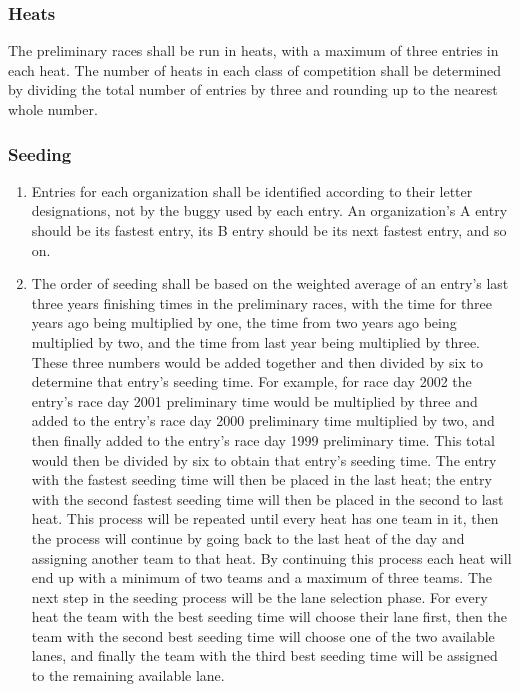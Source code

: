 \subsubsection{Heats}

The preliminary races shall be run in heats, with a maximum of three entries in each heat. The number of heats in each class of competition shall be determined by dividing the total number of entries by three and rounding up to the nearest whole number.

\subsubsection{Seeding}

	\begin{enumerate}
		\item Entries for each organization shall be identified according to their letter designations, not by the buggy used by each entry. An organization's A entry should be its fastest entry, its B entry should be its next fastest entry, and so on.

		\item The order of seeding shall be based on the weighted average of an entry's last three years finishing times in the preliminary races, with the time for three years ago being multiplied by one, the time from two years ago being multiplied by two, and the time from last year being multiplied by three. These three numbers would be added together and then divided by six to determine that entry's seeding time. For example, for race day 2002 the entry's race day 2001 preliminary time would be multiplied by three and added to the entry's race day 2000 preliminary time multiplied by two, and then finally added to the entry's race day 1999 preliminary time. This total would then be divided by six to obtain that entry's seeding time. The entry with the fastest seeding time will then be placed in the last heat; the entry with the second fastest seeding time will then be placed in the second to last heat. This process will be repeated until every heat has one team in it, then the process will continue by going back to the last heat of the day and assigning another team to that heat. By continuing this process each heat will end up with a minimum of two teams and a maximum of three teams. The next step in the seeding process will be the lane selection phase. For every heat the team with the best seeding time will choose their lane first, then the team with the second best seeding time will choose one of the two available lanes, and finally the team with the third best seeding time will be assigned to the remaining available lane.


\end{enumerate}
